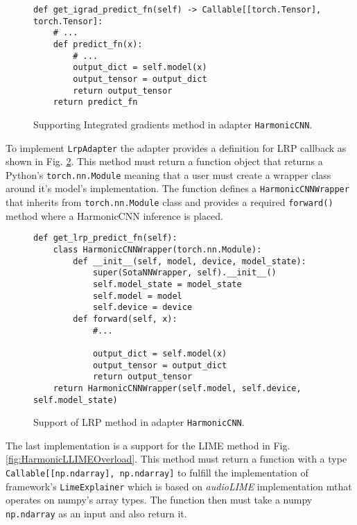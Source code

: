 \documentclass[
    bindingoffset=5mm,  %
    footnoteindent=3mm, %
    hyphenation=true    %
]{src/wut-thesis}
\begin{document}
\begin{figure}%
\begin{verbatim}
def get_igrad_predict_fn(self) -> Callable[[torch.Tensor], torch.Tensor]:
    # ...
    def predict_fn(x):
        # ... 
        output_dict = self.model(x)
        output_tensor = output_dict
        return output_tensor
    return predict_fn
\end{verbatim}
\caption{Supporting Integrated gradients method in adapter \texttt{HarmonicCNN}.}
\label{fig:HarmonicIgradOverload}
\end{figure}

To implement \texttt{LrpAdapter} the adapter provides a definition for LRP
callback as shown in Fig. \ref{fig:HarmonicLrpOverload}. This method must return
a function object that returns a Python's \texttt{torch.nn.Module} meaning
that a user must create a wrapper class around it's model's implementation.
The function defines a \texttt{HarmonicCNNWrapper} that inherits from 
\texttt{torch.nn.Module} class and provides a required
\texttt{forward()} method where a HarmonicCNN inference is placed.

\begin{figure}%
\begin{verbatim}
def get_lrp_predict_fn(self):
    class HarmonicCNNWrapper(torch.nn.Module):
        def __init__(self, model, device, model_state):
            super(SotaNNWrapper, self).__init__()
            self.model_state = model_state
            self.model = model 
            self.device = device
        def forward(self, x):
            #...

            output_dict = self.model(x)
            output_tensor = output_dict
            return output_tensor
    return HarmonicCNNWrapper(self.model, self.device, self.model_state)
\end{verbatim}
\caption{Support of LRP method in adapter \texttt{HarmonicCNN}.}
\label{fig:HarmonicLrpOverload}
\end{figure}

The last implementation is a support for the LIME method in Fig. \ref{fig:HarmonicLLIMEOverload}.
This method must return a function with a type \texttt{Callable[[np.ndarray], np.ndarray]}
to fulfill the implementation of framework’s \texttt{LimeExplainer} which is based on \textit{audioLIME}
implementation mthat operates on numpy’s array types. The function then must
take a numpy \texttt{np.ndarray} as an input and also return it.
\end{document}
